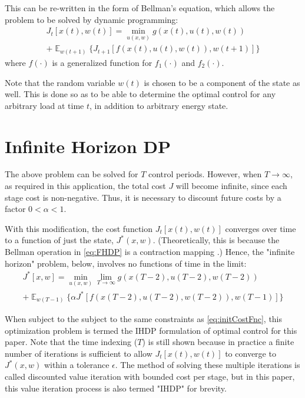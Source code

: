 \documentclass[conference]{IEEEtran}
\DeclareMathOperator{\E}{\mathbb{E}}
\begin{document}
This can be re-written in the form of Bellman's equation, which allows the problem to be solved by dynamic programming:
\begin{multline} \label{eq:FHDP}
J_{t}[x(t),w(t)]=\min_{u(x,w)} g(x(t),u(t),w(t))\\ + \mathop{\E}_{w(t+1)} \{J_{t+1}[f(x(t),u(t),w(t)),w(t+1)]\}
\end{multline}
where $f(\cdot)$ is a generalized function for $f_{1}(\cdot)$ and $f_{2}(\cdot)$.

Note that the random variable $w(t)$ is chosen to be a component of the state as well. This is done so as to be able to determine the optimal control for any arbitrary load at time $t$, in addition to arbitrary energy state. %

\section{Infinite Horizon DP}
The above problem can be solved for $T$ control periods. However, when $T\to\infty$, as required in this application, the total cost $J$ will become infinite, since each stage cost is non-negative. Thus, it is necessary to discount future costs by a factor $0<\alpha<1$.

With this modification, the cost function $J_{t}[x(t),w(t)]$ converges over time to a function of just the state, $J^{*}(x,w)$. (Theoretically, this is because the Bellman operation in \eqref{eq:FHDP} is a contraction mapping \cite{bertsekas1995dynamic}.) Hence, the "infinite horizon" problem, below, involves no functions of time in the limit:
\begin{multline} \label{eq:IHDP}
J^{*}[x,w]=\min_{u(x,w)} \lim_{T\to\infty} g(x(T-2),u(T-2),w(T-2))\\
+\mathop{\E}_{w(T-1)} \{\alpha J^{*}[f(x(T-2),u(T-2),w(T-2)),w(T-1)]
\}
\end{multline}

When subject to the subject to the same constraints as \eqref{eq:initCostFnc}, this optimization problem is termed the IHDP formulation of optimal control for this paper. Note that the time indexing ($T$) is still shown because in practice a finite number of iterations is sufficient to allow $J_{t}[x(t),w(t)]$ to converge to $J^{*}(x,w)$ within a tolerance $\epsilon$. The method of solving these multiple iterations is called discounted value iteration with bounded cost per stage, but in this paper, this value iteration process is also termed "IHDP" for brevity.
\end{document}
